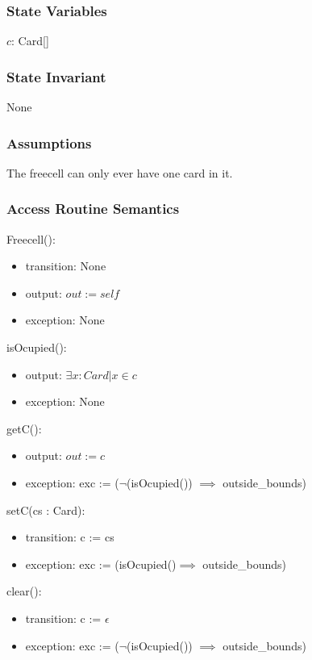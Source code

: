 \documentclass[12pt]{article}
\begin{document}
\subsubsection* {State Variables}

$c$: Card[]\\


\subsubsection* {State Invariant}

None

\subsubsection* {Assumptions}

The freecell can only ever have one card in it.

\subsubsection* {Access Routine Semantics}

Freecell():
\begin{itemize}
	\item transition: None
	\item output: $out := \mathit{self}$
	\item exception: None
\end{itemize}

\noindent isOcupied():
\begin{itemize}
	\item output: $\exists x : Card | x \in c$
	\item exception: None
\end{itemize}

\noindent getC():
\begin{itemize}
	\item output: $out := c$
	\item exception: exc := ($\lnot$(isOcupied()) $\implies$ outside\_bounds)
\end{itemize}

\noindent setC(cs : Card):
\begin{itemize}
	\item transition: c := cs
	\item exception: exc := (isOcupied()$\implies$ outside\_bounds)
\end{itemize}

\noindent clear():
\begin{itemize}
	\item transition: c := $\epsilon$
	\item exception: exc := ($\lnot$(isOcupied()) $\implies$ outside\_bounds)
\end{itemize}
\end{document}
